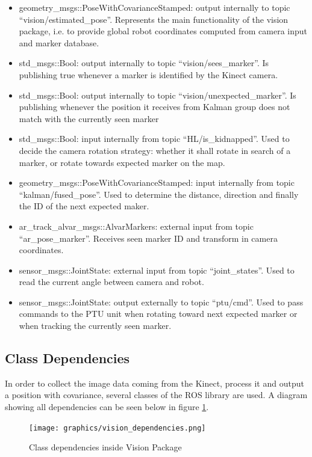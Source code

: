 \begin{itemize}
\item geometry\_msgs::PoseWithCovarianceStamped: output internally to topic ``vision/estimated\_pose''. Represents the main functionality of the vision package, i.e. to provide global robot coordinates computed from camera input and marker database.
\item std\_msgs::Bool: output internally to topic ``vision/sees\_marker''. Is publishing true whenever a marker is identified by the Kinect camera.
\item std\_msgs::Bool: output internally to topic ``vision/unexpected\_marker''. Is publishing whenever the position it receives from Kalman group does not match with the currently seen marker
\item std\_msgs::Bool: input internally from topic ``HL/is\_kidnapped''. Used to decide the camera rotation strategy: whether it shall rotate in search of a marker, or rotate towards expected marker on the map.
\item geometry\_msgs::PoseWithCovarianceStamped: input internally from topic ``kalman/fused\_pose''. Used to determine the distance, direction and finally the ID of the next expected maker.
\item ar\_track\_alvar\_msgs::AlvarMarkers: external input from topic ``ar\_pose\_marker''. Receives seen marker ID and transform in camera coordinates.
\item sensor\_msgs::JointState: external input from topic ``joint\_states''. Used to read the current angle between camera and robot.
\item sensor\_msgs::JointState: output externally to topic ``ptu/cmd''. Used to pass commands to the PTU unit when rotating toward next expected marker or when tracking the currently seen marker.
\end{itemize}

\subsection{Class Dependencies}
In order to collect the image data coming from the Kinect, process it and output a position with covariance, several classes of the ROS library are used. A diagram showing all dependencies can be seen below in figure \ref{Vision Dependencies}.

\begin{figure}
\begin{center}
\texttt{[image: graphics/vision\_dependencies.png]}
\caption{Class dependencies inside Vision Package}
\label{Vision Dependencies}
\end{center}
\end{figure}


